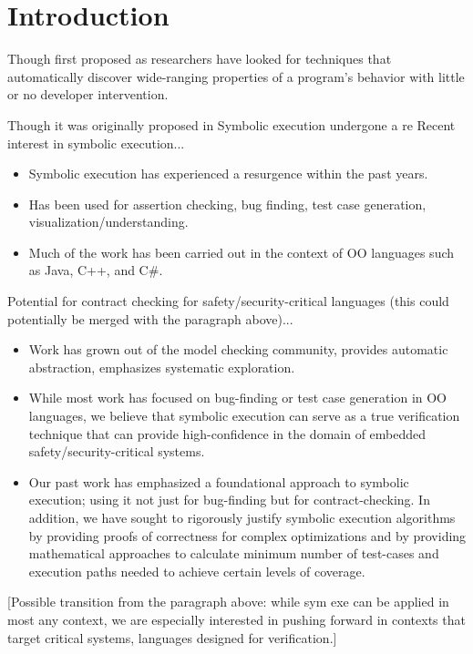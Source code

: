 \section{Introduction}
\label{sec:intro}

Though first proposed as researchers have looked for techniques that automatically discover
wide-ranging properties of a
program's behavior with little or no developer intervention.


Though it was originally proposed in Symbolic execution
undergone a re
Recent interest in symbolic execution...
\begin{itemize}
\item Symbolic execution has experienced a resurgence within the past
  years.
\item Has been used for assertion checking, bug finding, test case
  generation, visualization/understanding.
\item Much of the work has been carried out in the context of OO
  languages such as Java, C++, and C\#.
\end{itemize}

Potential for contract checking for safety/security-critical languages
(this could potentially be merged with the paragraph above)...
\begin{itemize}
\item Work has grown out of the model checking community, provides
  automatic abstraction, emphasizes systematic exploration.
\item While most work has focused on bug-finding or test case
  generation in OO languages, we believe that symbolic execution can serve as a 
true verification technique that can provide high-confidence in the
domain of embedded safety/security-critical systems.
\item Our past work has emphasized a foundational approach to symbolic
  execution; using it not just for bug-finding but for
  contract-checking.  In addition, we have sought to rigorously
  justify symbolic execution algorithms by providing proofs of
  correctness for complex optimizations and by providing mathematical
  approaches to calculate minimum number of test-cases and execution
  paths needed to achieve certain levels of coverage.
\end{itemize}
[Possible transition from the paragraph above:  while sym exe can be
applied in most any context, we are especially interested in pushing
forward in contexts that target critical systems, languages designed
for verification.]


